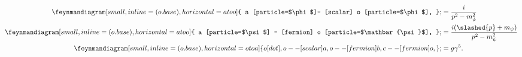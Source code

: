 \begin{align}
	\feynmandiagram[small, inline=(o.base), horizontal=a to o]{
		a [particle=$\phi$]-- [scalar] o [particle=$\phi$],
	};
	&= \frac{i}{p^2 - m_\phi^2} \label{eq:phi_to_phi_feynman_rule}\\
	\feynmandiagram[small, inline=(o.base), horizontal=a to o]{
		a [particle=$\psi$] -- [fermion] o [particle=$\mathbar{\psi}$],
	};
	&= \frac{i (\slashed{p} + m_\psi)}{p^2 - m_\psi^2} \label{eq:psi_to_psibar_feynman_rule}\\
	\feynmandiagram[small, inline=(o.base), horizontal=o to a]{
		o [dot],
		o -- [scalar] a,
		o -- [fermion] b,
		c -- [fermion] o,
	};
	&= g \gamma^5.\label{eq:phi_psi_psibar_vertex_feynman_rule}
\end{align}
